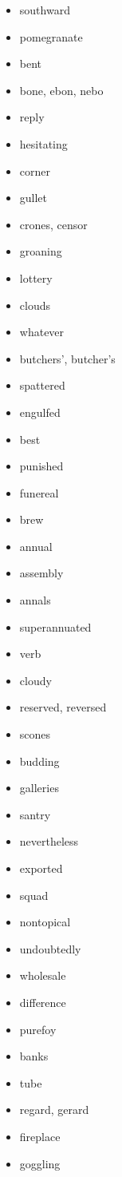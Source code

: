 \documentclass{article}
\begin{document}
\begin{itemize}
    \item southward
    \item pomegranate
    \item bent
    \item bone, ebon, nebo
    \item reply
    \item hesitating
    \item corner
    \item gullet
    \item crones, censor
    \item groaning
    \item lottery
    \item clouds
    \item whatever
    \item butchers', butcher's
    \item spattered
    \item engulfed
    \item best
    \item punished
    \item funereal
    \item brew
    \item annual
    \item assembly
    \item annals
    \item superannuated
    \item verb
    \item cloudy
    \item reserved, reversed
    \item scones
    \item budding
    \item galleries
    \item santry
    \item nevertheless
    \item exported
    \item squad
    \item nontopical
    \item undoubtedly
    \item wholesale
    \item difference
    \item purefoy
    \item banks
    \item tube
    \item regard, gerard
    \item fireplace
    \item goggling

\end{itemize}
\end{document}

